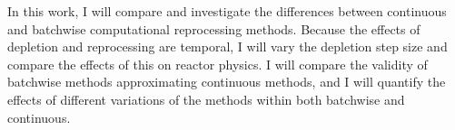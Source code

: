 In this work, I will compare and investigate the differences between continuous and batchwise computational reprocessing methods.
Because the effects of depletion and reprocessing are temporal, I will vary the depletion step size and compare the effects of this on reactor physics.
I will compare the validity of batchwise methods approximating continuous methods, and I will quantify the effects of different variations of the methods within both batchwise and continuous.

